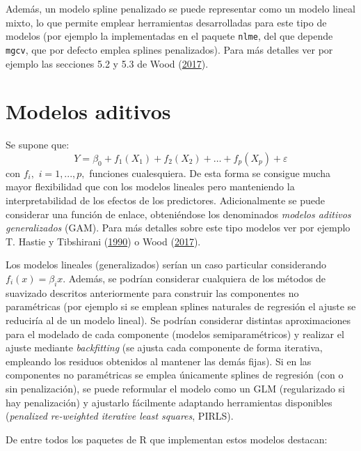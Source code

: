 \documentclass[
]{book}
\theoremstyle{break}
\theoremstyle{nonumberplain}
\begin{document}
Además, un modelo spline penalizado se puede representar como un modelo lineal mixto, lo que permite emplear herramientas desarrolladas para este tipo de modelos (por ejemplo la implementadas en el paquete \texttt{nlme}, del que depende \texttt{mgcv}, que por defecto emplea splines penalizados).
Para más detalles ver por ejemplo las secciones 5.2 y 5.3 de Wood (\protect\hyperlink{ref-wood2017generalized}{2017}).

\hypertarget{reg-gam}{%
\section{Modelos aditivos}\label{reg-gam}}

Se supone que:
\[Y= \beta_{0} + f_1(X_1) + f_2(X_2) + \ldots + f_p(X_p)  + \varepsilon\]
con \(f_{i},\) \(i=1,...,p,\) funciones cualesquiera.
De esta forma se consigue mucha mayor flexibilidad que con los modelos lineales pero manteniendo la interpretabilidad de los efectos de los predictores.
Adicionalmente se puede considerar una función de enlace, obteniéndose los denominados \emph{modelos aditivos generalizados} (GAM). Para más detalles sobre este tipo modelos ver por ejemplo T. Hastie y Tibshirani (\protect\hyperlink{ref-hastie1990generalized}{1990}) o Wood (\protect\hyperlink{ref-wood2017generalized}{2017}).

Los modelos lineales (generalizados) serían un caso particular considerando \(f_{i}(x) = \beta_{i}x\).
Además, se podrían considerar cualquiera de los métodos de suavizado descritos anteriormente para construir las componentes no paramétricas (por ejemplo si se emplean splines naturales de regresión el ajuste se reduciría al de un modelo lineal).
Se podrían considerar distintas aproximaciones para el modelado de cada componente (modelos semiparamétricos) y realizar el ajuste mediante \emph{backfitting} (se ajusta cada componente de forma iterativa, empleando los residuos obtenidos al mantener las demás fijas).
Si en las componentes no paramétricas se emplea únicamente splines de regresión (con o sin penalización), se puede reformular el modelo como un GLM (regularizado si hay penalización) y ajustarlo fácilmente adaptando herramientas disponibles (\emph{penalized re-weighted iterative least squares}, PIRLS).

De entre todos los paquetes de R que implementan estos modelos destacan:
\end{document}
